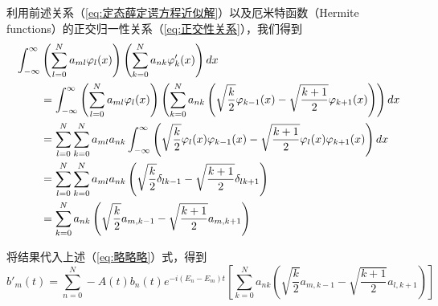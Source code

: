 \documentclass[12pt]{ctexart}
\numberwithin{equation}{section} %
\begin{document}
利用前述关系（\ref{eq:定态薛定谔方程近似解}）以及厄米特函数（Hermite functions）的正交归一性关系（\ref{eq:正交性关系}），我们得到
\begin{align}
    \int_{-\infty}^{\infty} &\left(\sum_{l=0}^{N}a_{ml}\varphi_{l}(x)\right)\left(\sum_{k=0}^{N}a_{nk}\varphi_{k}^{\prime}(x)\right)dx \notag\\
    &= \int_{-\infty}^{\infty} \left(\sum_{l=0}^{N}a_{ml}\varphi_{l}(x)\right) \left(\sum_{k=0}^{N}a_{nk}\left(\sqrt{\frac{k}{2}}\varphi_{k-1}(x)-\sqrt{\frac{k+1}{2}}\varphi_{k+1}(x)\right)\right)dx \notag\\
    &= \sum_{l=0}^{N}\sum_{k=0}^{N}a_{ml}a_{nk}\int_{-\infty}^{\infty} \left(\sqrt{\frac{k}{2}}\varphi_{l}(x)\varphi_{k-1}(x)-\sqrt{\frac{k+1}{2}}\varphi_{l}(x)\varphi_{k+1}(x)\right)dx \notag\\
    &= \sum_{l=0}^{N}\sum_{k=0}^{N}a_{ml}a_{nk}\left(\sqrt{\frac{k}{2}}\delta_{lk-1}-\sqrt{\frac{k+1}{2}}\delta_{lk+1}\right) \notag\\
    &= \sum_{k=0}^{N}a_{nk}\left(\sqrt{\frac{k}{2}}a_{m,k-1}-\sqrt{\frac{k+1}{2}}a_{m,k+1}\right)
\end{align}
    


    将结果代入上述（\ref{eq:略略略}）式，得到
    \begin{equation}
       \boxed{ b'_{m}(t)=\sum_{n=0}^{N}-A(t)b_{n}(t)e^{-i(E_{n}-E_{m})t}\left[\sum_{k=0}^{N}a_{nk}\left(\sqrt{\frac{k}{2}}a_{m,k-1}-\sqrt{\frac{k+1}{2}}a_{l,k+1}\right)\right]}
    \end{equation}



\end{document}
